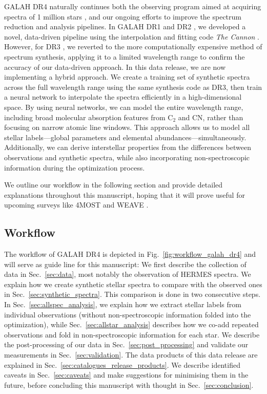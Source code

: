 \documentclass[
  journal=pasa,
  manuscript=research-paper, %
  year=2024,
  volume=37
]{cup-journal}
\begin{document}
GALAH DR4 naturally continues both the observing program aimed at acquiring spectra of 1 million stars \citep{DeSilva2015}, and our ongoing efforts to improve the spectrum reduction and analysis pipelines. In GALAH DR1 and DR2 \citep{Martell2017, Buder2018}, we developed a novel, data-driven pipeline using the interpolation and fitting code \textit{The Cannon} \citep{Ness2015}. However, for DR3 \citep{Buder2021}, we reverted to the more computationally expensive method of spectrum synthesis, applying it to a limited wavelength range to confirm the accuracy of our data-driven approach. In this data release, we are now implementing a hybrid approach. We create a training set of synthetic spectra across the full wavelength range using the same synthesis code as DR3, then train a neural network to interpolate the spectra efficiently in a high-dimensional space. By using neural networks, we can model the entire wavelength range, including broad molecular absorption features from $\mathrm{C_2}$ and CN, rather than focusing on narrow atomic line windows. This approach allows us to model all stellar labels—global parameters and elemental abundances—simultaneously. Additionally, we can derive interstellar properties from the differences between observations and synthetic spectra, while also incorporating non-spectroscopic information during the optimization process.

We outline our workflow in the following section and provide detailed explanations throughout this manuscript, hoping that it will prove useful for upcoming surveys like 4MOST \citep{4MOST2019} and WEAVE \citep{Dalton2014}.

\subsection{Workflow} \label{sec:workflow}

The workflow of GALAH DR4 is depicted in Fig.~\ref{fig:workflow_galah_dr4} and will serve as guide line for this manuscript: We first describe the collection of data in Sec.~\ref{sec:data}, most notably the observation of HERMES spectra. We explain how we create synthetic stellar spectra to compare with the observed ones in Sec.~\ref{sec:synthetic_spectra}. This comparison is done in two consecutive steps. In Sec.~\ref{sec:allspec_analysis}, we explain how we extract stellar labels from individual observations (without non-spectroscopic information folded into the optimization), while Sec.~\ref{sec:allstar_analysis} describes how we co-add repeated observations and fold in non-spectroscopic information for each star. We describe the post-processing of our data in Sec.~\ref{sec:post_processing} and validate our measurements in Sec.~\ref{sec:validation}. The data products of this data release are explained in Sec.~\ref{sec:catalogues_release_products}. We describe identified caveats in Sec.~\ref{sec:caveats} and make suggestions for minimising them in the future, before concluding this manuscript with thought in Sec.~\ref{sec:conclusion}.
\end{document}
